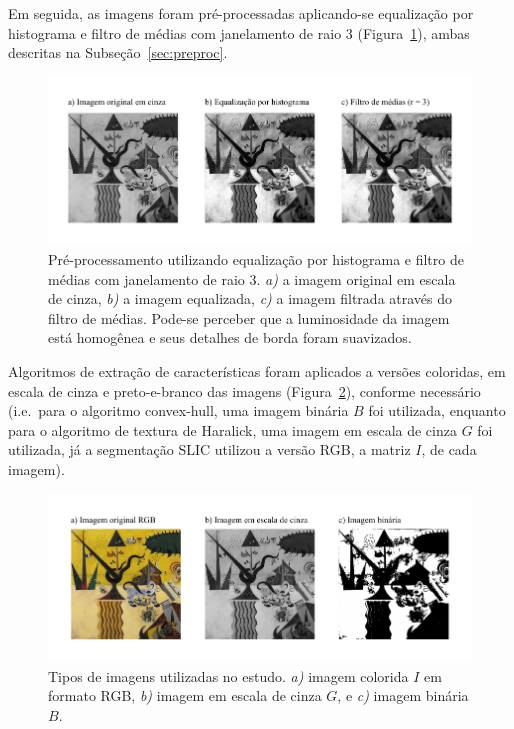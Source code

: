 Em seguida, as imagens foram pré-processadas aplicando-se equalização
por histograma e filtro de médias com janelamento de raio 3
(Figura~\ref{fig:eq}), ambas descritas na Subseção~\ref{sec:preproc}.

\begin{figure}[ht!]
\begin{center}
        \includegraphics[scale=1.2]{figs/passos_eq}
      \caption{Pré-processamento utilizando equalização por histograma
        e filtro de médias com janelamento de raio 3. \textit{a)} a
        imagem original em escala de cinza, \textit{b)} a imagem
        equalizada, \textit{c)} a imagem filtrada através do filtro de
        médias. Pode-se perceber que a luminosidade da imagem está
        homogênea e seus detalhes de borda foram suavizados.}
        \label{fig:eq}
\end{center}
\end{figure}

Algoritmos de extração de características foram aplicados a versões
coloridas, em escala de cinza e preto-e-branco das imagens
(Figura~\ref{fig:tipos}), conforme necessário (i.e.\ para o algoritmo
convex-hull, uma imagem binária $B$ foi utilizada, enquanto para o
algoritmo de textura de Haralick, uma imagem em escala de cinza $G$
foi utilizada, já a segmentação SLIC utilizou a versão RGB, a matriz
$I$, de cada imagem).

\begin{figure}[ht!]
\begin{center}
        \includegraphics[scale=1.2]{figs/passos_tipos}
      \caption{Tipos de imagens utilizadas no estudo. \textit{a)}
        imagem colorida $I$ em formato RGB, \textit{b)} imagem em
        escala de cinza $G$, e \textit{c)} imagem binária $B$.}
        \label{fig:tipos}
\end{center}
\end{figure}

